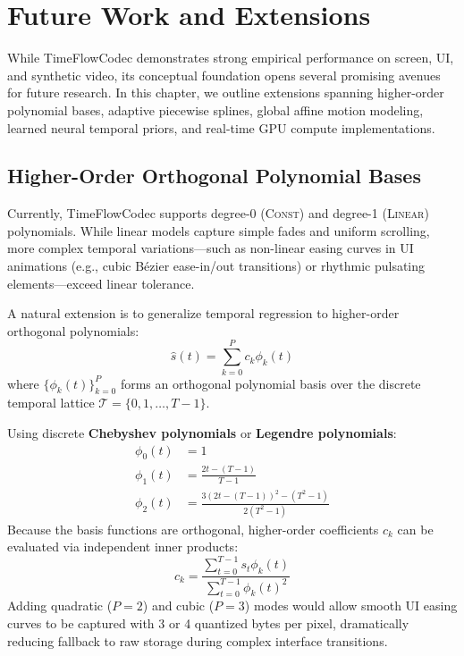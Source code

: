 \chapter{Future Work and Extensions}
\label{chap:future_work}

While TimeFlowCodec demonstrates strong empirical performance on screen, UI, and synthetic video, its conceptual foundation opens several promising avenues for future research. In this chapter, we outline extensions spanning higher-order polynomial bases, adaptive piecewise splines, global affine motion modeling, learned neural temporal priors, and real-time GPU compute implementations.

\section{Higher-Order Orthogonal Polynomial Bases}
Currently, TimeFlowCodec supports degree-0 (\textsc{Const}) and degree-1 (\textsc{Linear}) polynomials. While linear models capture simple fades and uniform scrolling, more complex temporal variations---such as non-linear easing curves in UI animations (e.g., cubic Bézier ease-in/out transitions) or rhythmic pulsating elements---exceed linear tolerance.

A natural extension is to generalize temporal regression to higher-order orthogonal polynomials:
\begin{equation}
    \hat{s}(t) = \sum_{k=0}^{P} c_k \phi_k(t)
\end{equation}
where $\{\phi_k(t)\}_{k=0}^P$ forms an orthogonal polynomial basis over the discrete temporal lattice $\mathcal{T} = \{0, 1, \dots, T-1\}$.

Using discrete \textbf{Chebyshev polynomials} or \textbf{Legendre polynomials}:
\begin{align}
    \phi_0(t) &= 1 \\
    \phi_1(t) &= \frac{2t - (T-1)}{T-1} \\
    \phi_2(t) &= \frac{3(2t - (T-1))^2 - (T^2 - 1)}{2(T^2 - 1)}
\end{align}
Because the basis functions are orthogonal, higher-order coefficients $c_k$ can be evaluated via independent inner products:
\begin{equation}
    c_k = \frac{\sum_{t=0}^{T-1} s_t \phi_k(t)}{\sum_{t=0}^{T-1} \phi_k(t)^2}
\end{equation}
Adding quadratic ($P=2$) and cubic ($P=3$) modes would allow smooth UI easing curves to be captured with 3 or 4 quantized bytes per pixel, dramatically reducing fallback to raw storage during complex interface transitions.


